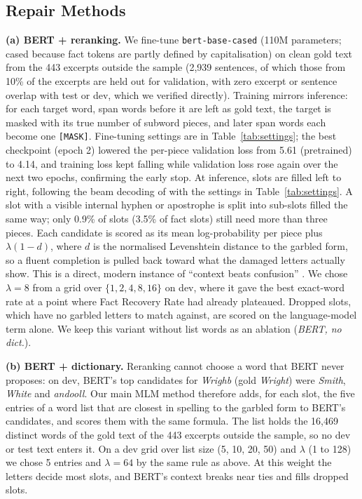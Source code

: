 \subsection{Repair Methods}
\label{sec:models}
\begin{sloppypar}
\textbf{(a) BERT + reranking.} We fine-tune \texttt{bert-base-cased} \citep{devlin2019bert} (110M parameters; cased
because fact tokens are partly defined by capitalisation) on clean gold text from the 443 excerpts outside the
sample (2,939 sentences, of which those from 10\% of the excerpts are held out for validation, with zero excerpt or sentence
overlap with test or dev, which we verified directly). Training mirrors inference: for each target word, span words
before it are left as gold text, the target is masked with its true number of subword pieces, and later span words
each become one \texttt{[MASK]}. Fine-tuning settings are in Table~\ref{tab:settings}; the best checkpoint
(epoch 2) lowered the per-piece validation loss from 5.61 (pretrained) to 4.14, and training loss kept falling while
validation loss rose again over the next two epochs, confirming the early stop. At inference, slots are filled left
to right, following the beam decoding of \citet{lazar2021filling} with the settings in Table~\ref{tab:settings}. A slot with a visible
internal hyphen or apostrophe is split into sub-slots filled the same way; only 0.9\% of slots (3.5\% of fact slots)
still need more than three pieces. Each candidate is scored as its mean log-probability per piece plus
$\lambda(1-d)$, where $d$ is the normalised Levenshtein distance to the garbled form, so a fluent completion is
pulled back toward what the damaged letters actually show. This is a direct, modern instance of ``context beats
confusion'' \citep{evershed2014correcting}. We chose $\lambda = 8$ from a grid over $\{1,2,4,8,16\}$ on dev, where it
gave the best exact-word rate at a point where Fact Recovery Rate had already plateaued. Dropped slots, which have no
garbled letters to match against, are scored on the language-model term alone. We keep this variant without list words as
an ablation (\emph{BERT, no dict.}).
\end{sloppypar}

\textbf{(b) BERT + dictionary.} Reranking cannot choose a word that BERT never proposes: on dev, BERT's top
candidates for \emph{Wrighb} (gold \emph{Wright}) were \emph{Smith}, \emph{White} and \emph{andooll}. Our main MLM
method therefore adds, for each slot, the five entries of a word list that are closest in spelling to the garbled
form to BERT's candidates, and scores them with the same formula. The list holds the 16,469 distinct words of the
gold text of the 443 excerpts outside the sample, so no dev or test text enters it. On a dev grid over list size
(5, 10, 20, 50) and $\lambda$ (1 to 128) we chose 5 entries and $\lambda = 64$ by the same rule as above. At this
weight the letters decide most slots, and BERT's context breaks near ties and fills dropped slots.

